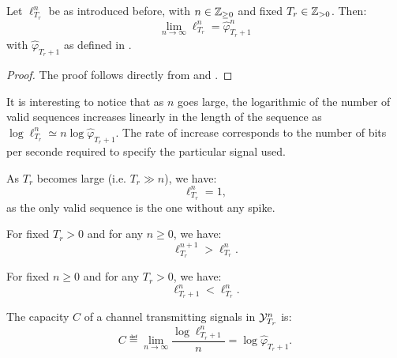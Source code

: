 \documentclass{article}
\begin{document}
  \begin{theorem} \label{thm:asymptotic}
    Let $\ell_{T_r}^{n}$ be as introduced before, with $n \in \mathbb{Z}_{\geq 0}$ and fixed $T_r \in \mathbb{Z}_{> 0}$.
    Then:
    \begin{equation}
      \lim_{n \to \infty} \ell_{T_r}^{n} = \hat{\varphi}_{T_r + 1}^n
    \end{equation}
    with $\hat{\varphi}_{T_r + 1}$ as defined in .
  \end{theorem}

  \begin{proof}
    The proof follows directly from  and .
  \end{proof}

  It is interesting to notice that as $n$ goes large, the logarithmic of the number of valid sequences
  increases linearly in the length of the sequence as $\log \ell_{T_r}^{n} \simeq n \log \hat{\varphi}_{T_r + 1}$.
  The rate of increase corresponds to the number of bits per seconde required to specify the particular signal used.

  \begin{remark}
    As $T_r$ becomes large (i.e. $T_r \gg n$), we have:
    \begin{equation}
      \ell_{T_r}^{n} = 1,
    \end{equation}
    as the only valid sequence is the one without any spike.
  \end{remark}

  \begin{remark}
    For fixed $T_r > 0$ and for any $n \geq 0$, we have:
    \begin{equation}
      \ell_{T_r}^{n+1} > \ell_{T_r}^{n}.
    \end{equation}
  \end{remark}

  \begin{remark}
    For fixed $n \geq 0$ and for any $T_r > 0$, we have:
    \begin{equation}
      \ell_{T_r+1}^{n} < \ell_{T_r}^{n}.
    \end{equation}
  \end{remark}

  \begin{remark}[Capacity]
    The capacity $C$ of a channel transmitting signals in $\mathcal{Y}_{T_r}^n$ is:
    \begin{equation}
      C \eqdef \lim_{n \to \infty} \frac{\log \ell_{T_r+1}^{n}}{n} = \log \hat{\varphi}_{T_r + 1}.
    \end{equation}
  \end{remark}
\end{document}
